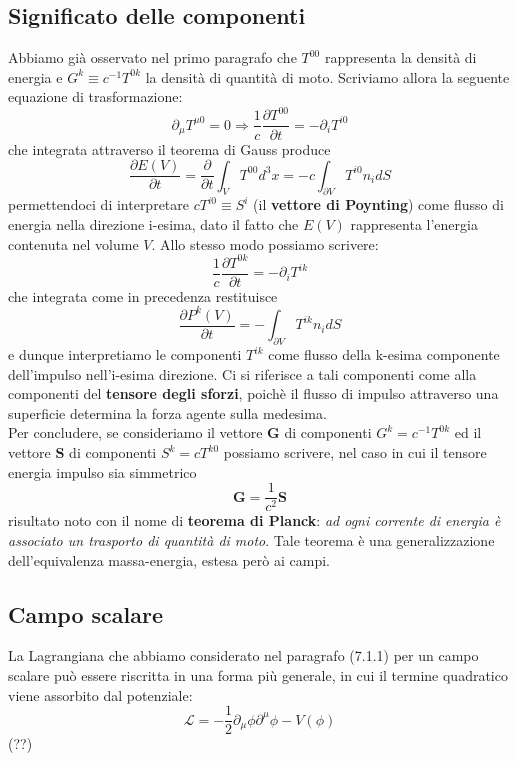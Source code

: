\documentclass[a4paper,11pt]{book}
\theoremstyle{plain}
\theoremstyle{definition}
\begin{document}
\subsection{Significato delle componenti}
Abbiamo già osservato nel primo paragrafo che $T^{00}$ rappresenta la densità di energia e $G^{k} \equiv c^{-1}T^{0k}$ la densità di quantità di moto. Scriviamo allora la seguente equazione di trasformazione:
\[
\partial_{\mu}T^{\mu 0}=0 \Longrightarrow \frac{1}{c}\frac{\partial T^{00}}{\partial t} = -\partial_i T^{i0}
\]
che integrata attraverso il teorema di Gauss produce
\[
\frac{\partial E(V)}{\partial t} = \frac{\partial}{\partial t} \int_{V} T^{00} d^3x = -c \int_{\partial V} T^{i0}n_idS
\]
permettendoci di interpretare $cT^{i0}\equiv S^i$ (il \textbf{vettore di Poynting}) come flusso di energia nella direzione i-esima, dato il fatto che $E(V)$ rappresenta l'energia contenuta nel volume $V$. Allo stesso modo possiamo scrivere:
\[
\frac{1}{c}\frac{\partial T^{0k}}{\partial t} = -\partial_i T^{ik}
\]
che integrata come in precedenza restituisce
\[
\frac{\partial P^k(V)}{\partial t} = - \int_{\partial V}T^{ik}n_i dS
\]
e dunque interpretiamo le componenti $T^{ik}$ come flusso della k-esima componente dell'impulso nell'i-esima direzione. Ci si riferisce a tali componenti come alla componenti del \textbf{tensore degli sforzi}, poichè il flusso di impulso attraverso una superficie determina la forza agente sulla medesima. 
\\
Per concludere, se consideriamo il vettore $\textbf{G}$ di componenti $G^k = c^{-1}T^{0k}$ ed il vettore $\textbf{S}$ di componenti $S^k = cT^{k0}$ possiamo scrivere, nel caso in cui il tensore energia impulso sia simmetrico
\[
\textbf{G}=\frac{1}{c^2}\textbf{S}
\]
risultato noto con il nome di \textbf{teorema di Planck}: \emph{ad ogni corrente di energia è associato un trasporto di quantità di moto}. Tale teorema è una generalizzazione dell'equivalenza massa-energia, estesa però ai campi.  

\subsection{Campo scalare}
La Lagrangiana che abbiamo considerato nel paragrafo (7.1.1) per un campo scalare può essere riscritta in una forma più generale, in cui il termine quadratico viene assorbito dal potenziale:
\[
\mathcal{L} = -\frac{1}{2}\partial_{\mu}\phi\partial^{\mu}\phi-V(\phi)
\]
(??)
\end{document}
